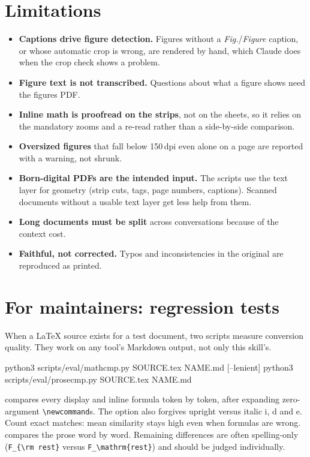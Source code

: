 \documentclass[11pt,a4paper]{article}
\begin{document}
\section{Limitations}
\begin{itemize}
\item \textbf{Captions drive figure detection.} Figures without a \emph{Fig.}/\emph{Figure}
  caption, or whose automatic crop is wrong, are rendered by hand, which Claude does when the
  crop check shows a problem.
\item \textbf{Figure text is not transcribed.} Questions about what a figure shows need the figures PDF.
\item \textbf{Inline math is proofread on the strips}, not on the sheets, so it relies on the
  mandatory zooms and a re-read rather than a side-by-side comparison.
\item \textbf{Oversized figures} that fall below 150\,dpi even alone on a page are reported
  with a warning, not shrunk.
\item \textbf{Born-digital PDFs are the intended input.} The scripts use the text layer for
  geometry (strip cuts, tags, page numbers, captions). Scanned documents without a usable text
  layer get less help from them.
\item \textbf{Long documents must be split} across conversations because of the context cost.
\item \textbf{Faithful, not corrected.} Typos and inconsistencies in the original are reproduced as printed.
\end{itemize}

\section{For maintainers: regression tests}
When a LaTeX source exists for a test document, two scripts measure conversion quality. They
work on any tool's Markdown output, not only this skill's.
\begin{cmd}
python3 scripts/eval/mathcmp.py SOURCE.tex NAME.md [--lenient]
python3 scripts/eval/prosecmp.py SOURCE.tex NAME.md
\end{cmd}
 compares every display and inline formula token by token, after expanding
zero-argument \verb|\newcommand|s. The  option also forgives upright versus
italic i, d and e. Count exact matches: mean similarity stays high even when formulas are
wrong.  compares the prose word by word. Remaining differences are often
spelling-only (\verb|F_{\rm rest}| versus \verb|F_\mathrm{rest}|) and should be judged
individually.
\end{document}
